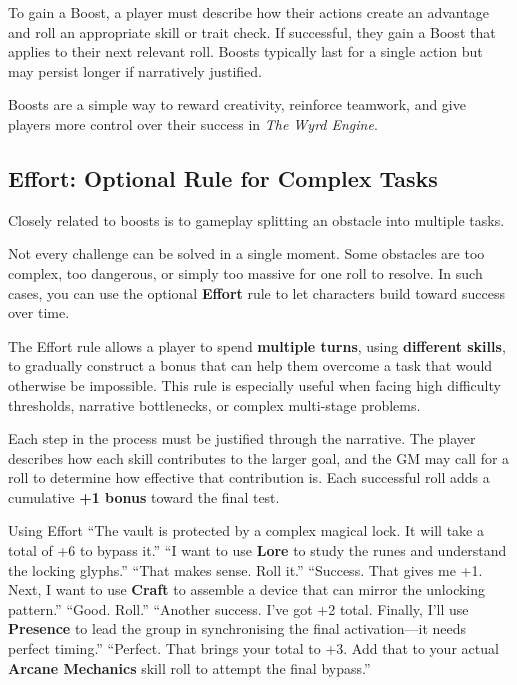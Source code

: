 \begin{multicols}{2}
To gain a Boost, a player must describe how their actions create an advantage and roll an appropriate skill or trait check. If successful, they gain a Boost that applies to their next relevant roll. Boosts typically last for a single action but may persist longer if narratively justified.  

Boosts are a simple way to reward creativity, reinforce teamwork, and give players more control over their success in \textit{The Wyrd Engine}.

\subsection{Effort: Optional Rule for Complex Tasks}

Closely related to boosts is to gameplay splitting an obstacle into multiple tasks.

Not every challenge can be solved in a single moment. Some obstacles are too complex, too dangerous, or simply too massive for one roll to resolve. In such cases, you can use the optional \textbf{Effort} rule to let characters build toward success over time.

The Effort rule allows a player to spend \textbf{multiple turns}, using \textbf{different skills}, to gradually construct a bonus that can help them overcome a task that would otherwise be impossible. This rule is especially useful when facing high difficulty thresholds, narrative bottlenecks, or complex multi-stage problems.

Each step in the process must be justified through the narrative. The player describes how each skill contributes to the larger goal, and the GM may call for a roll to determine how effective that contribution is. Each successful roll adds a cumulative \textbf{+1 bonus} toward the final test.

\begin{ExampleGame}{Using Effort}
    \line[GM]     “The vault is protected by a complex magical lock. It will take a total of +6 to bypass it.” 
    \line[Player] “I want to use \textbf{Lore} to study the runes and understand the locking glyphs.” 
    \line[GM]     “That makes sense. Roll it.” 
    \line[Player] “Success. That gives me +1. Next, I want to use \textbf{Craft} to assemble a device that can mirror the unlocking pattern.” 
    \line[GM]     “Good. Roll.” 
    \line[Player] “Another success. I’ve got +2 total. Finally, I’ll use \textbf{Presence} to lead the group in synchronising the final activation—it needs perfect timing.” 
    \line[GM]     “Perfect. That brings your total to +3. Add that to your actual \textbf{Arcane Mechanics} skill roll to attempt the final bypass.”
\end{ExampleGame}


\end{multicols}
